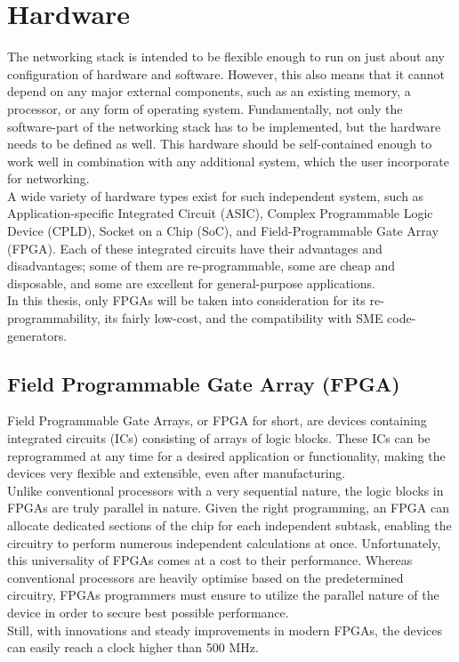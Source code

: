 \section{Hardware}
The networking stack is intended to be flexible enough to run on just about any 
configuration of hardware and software. However, this also means that it cannot 
depend on any major external components, such as an existing memory, a processor,
or any form of operating system. Fundamentally, not only the software-part of the
networking stack has to be implemented, but the hardware needs to be defined 
as well. This hardware should be self-contained enough to work well in combination 
with any additional system, which the user incorporate for networking.\\
A wide variety of hardware types exist for such independent system, such as 
Application-specific Integrated Circuit (ASIC), Complex Programmable Logic 
Device (CPLD), Socket on a Chip (SoC), and Field-Programmable Gate Array (FPGA).
Each of these integrated circuits have their advantages and disadvantages; some
of them are re-programmable, some are cheap and disposable, and some are excellent 
for general-purpose applications.\\
In this thesis, only FPGAs will be taken into consideration for its re-programmability,
its fairly low-cost, and the compatibility with SME code-generators.


\subsection{Field Programmable Gate Array (FPGA)}
Field Programmable Gate Arrays, or FPGA for short, are devices containing 
integrated circuits (ICs) consisting of arrays of logic blocks. These ICs can 
be reprogrammed at any time for a desired application or functionality\cite{ni_fpga},
making the devices very flexible and extensible, even after manufacturing.\\
Unlike conventional processors with a very sequential nature, the logic blocks 
in FPGAs are truly parallel in nature. Given the right programming, an FPGA can
allocate dedicated sections of the chip for each independent subtask, enabling
the circuitry to perform numerous independent calculations at once\cite{ni_fpga}.
Unfortunately, this universality of FPGAs comes at a cost to their performance.
Whereas conventional processors are heavily optimise based on the predetermined 
circuitry, FPGAs programmers must ensure to utilize the parallel nature of the
device in order to secure best possible performance.\\
Still, with innovations and steady improvements in modern FPGAs, the devices 
can easily reach a clock higher than 500 MHz\cite{xilinx_fpga}.   






